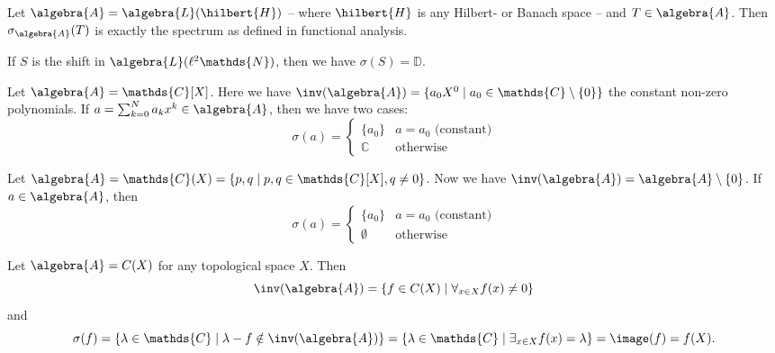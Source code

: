 \documentclass[a4paper]{article}
\begin{document}
\begin{example}
	Let $\algebra{A} = \algebra{L}(\hilbert{H})$ -- where $\hilbert{H}$ is any Hilbert- or Banach space -- and $T \in \algebra{A}$. Then $\sigma_\algebra{A}(T)$ is exactly the spectrum as defined in functional analysis.

	If $S$ is the shift in $\algebra{L}(\ell^2 \mathds{N})$, then we have $\sigma(S) = \mathds{D}$.
\end{example}

\begin{example}
	Let $\algebra{A} = \mathds{C}[X]$. Here we have $\inv(\algebra{A}) = \{a_0 X^0 \mid a_0 \in \mathds{C} \setminus \{0\}\}$ the constant non-zero polynomials. If $a = \sum_{k=0}^{N} a_k x^k \in \algebra{A}$, then we have two cases:
	\begin{equation*}
		\sigma(a) = \left\{ \begin{matrix}
			\{a_0\}    & a = a_0 \text{ (constant)} \\
			\mathds{C} & \text{otherwise}
		\end{matrix}
		\right.
	\end{equation*}
\end{example}

\begin{example}
	Let $\algebra{A} = \mathds{C}(X) = \{p,q \mid p,q \in \mathds{C}[X], q \neq 0 \}$. Now we have $\inv(\algebra{A}) = \algebra{A} \setminus \{0\}$. If $a \in \algebra{A}$, then
	\begin{equation*}
		\sigma(a) = \left\{ \begin{matrix}
			\{a_0\}   & a = a_0 \text{ (constant)} \\
			\emptyset & \text{otherwise}
		\end{matrix}\right.
	\end{equation*}
\end{example}

\begin{example}
	Let $\algebra{A} = C(X)$ for any topological space $X$. Then
	\begin{equation*}
		\inv(\algebra{A}) = \{f \in C(X) \mid \forall_{x \in X} f(x) \neq 0\}
	\end{equation*}
	and
	\begin{equation*}
		\sigma(f) = \{\lambda \in \mathds{C} \mid \lambda - f \notin \inv(\algebra{A})\} = \{\lambda \in \mathds{C} \mid \exists_{x \in X} f(x) = \lambda\} = \image(f) = f(X)\text{.}
	\end{equation*}
\end{example}
\end{document}
